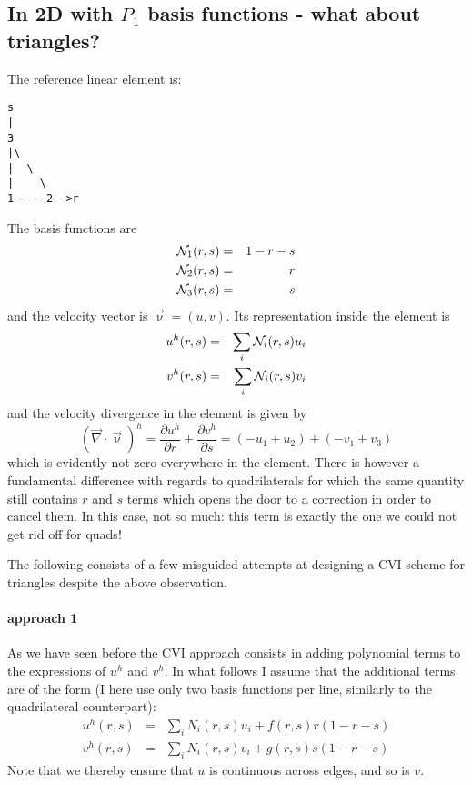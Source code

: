 \subsection{In 2D with $P_1$ basis functions - what about triangles?}


The reference linear element is: 
\begin{verbatim}
s
|
3
|\
|  \
|    \
1-----2 ->r
\end{verbatim}

The basis functions are 
\begin{eqnarray}
{\mathcal{N}}_1(r,s) &=& 1-r-s \nonumber\\
{\mathcal{N}}_2(r,s) &=& r \nonumber\\
{\mathcal{N}}_3(r,s) &=& s 
\end{eqnarray}
and the velocity vector is $\vec\upnu=(u,v)$. 
Its representation inside the element is 
\begin{eqnarray}
u^h(r,s)&=&\sum_i {\mathcal{N}}_i(r,s) u_i \nonumber\\
v^h(r,s)&=&\sum_i {\mathcal{N}}_i(r,s) v_i \nonumber
\end{eqnarray}
and the velocity divergence in the element is given by
\[
(\vec\nabla\cdot\vec\upnu)^h = 
\frac{\partial u^h}{\partial r}
+
\frac{\partial v^h}{\partial s}
=(-u_1+u_2)+(-v_1+v_3)
\]
which is evidently not zero everywhere in the element.
There is however a fundamental difference with regards to quadrilaterals
for which the same quantity still contains $r$ and $s$ terms which 
opens the door to a correction in order to cancel them.
In this case, not so much: this term is exactly the one
we could not get rid off for quads!

The following consists of a few misguided attempts at designing a 
CVI scheme for triangles despite the above observation.

\paragraph{approach 1}
As we have seen before the CVI approach consists in adding polynomial 
terms to the expressions of $u^h$ and $v^h$.
In what follows I assume that the additional terms are of the form 
(I here use only two basis functions per line, similarly to the quadrilateral counterpart):
\begin{eqnarray}
u^h(r,s)&=&\sum_i N_i(r,s) u_i + f(r,s) r(1-r-s) \\
v^h(r,s)&=&\sum_i N_i(r,s) v_i + g(r,s) s(1-r-s) 
\end{eqnarray}
Note that we thereby ensure that $u$ is continuous across edges, and so is $v$.

